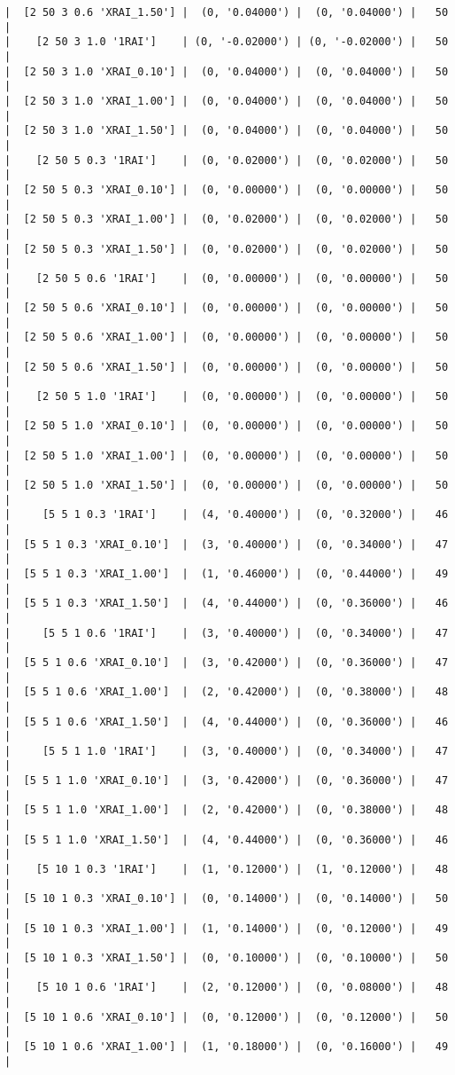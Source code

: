 \documentclass{article}
\begin{document}
\begin{verbatim}
|  [2 50 3 0.6 'XRAI_1.50'] |  (0, '0.04000') |  (0, '0.04000') |   50  |
|    [2 50 3 1.0 '1RAI']    | (0, '-0.02000') | (0, '-0.02000') |   50  |
|  [2 50 3 1.0 'XRAI_0.10'] |  (0, '0.04000') |  (0, '0.04000') |   50  |
|  [2 50 3 1.0 'XRAI_1.00'] |  (0, '0.04000') |  (0, '0.04000') |   50  |
|  [2 50 3 1.0 'XRAI_1.50'] |  (0, '0.04000') |  (0, '0.04000') |   50  |
|    [2 50 5 0.3 '1RAI']    |  (0, '0.02000') |  (0, '0.02000') |   50  |
|  [2 50 5 0.3 'XRAI_0.10'] |  (0, '0.00000') |  (0, '0.00000') |   50  |
|  [2 50 5 0.3 'XRAI_1.00'] |  (0, '0.02000') |  (0, '0.02000') |   50  |
|  [2 50 5 0.3 'XRAI_1.50'] |  (0, '0.02000') |  (0, '0.02000') |   50  |
|    [2 50 5 0.6 '1RAI']    |  (0, '0.00000') |  (0, '0.00000') |   50  |
|  [2 50 5 0.6 'XRAI_0.10'] |  (0, '0.00000') |  (0, '0.00000') |   50  |
|  [2 50 5 0.6 'XRAI_1.00'] |  (0, '0.00000') |  (0, '0.00000') |   50  |
|  [2 50 5 0.6 'XRAI_1.50'] |  (0, '0.00000') |  (0, '0.00000') |   50  |
|    [2 50 5 1.0 '1RAI']    |  (0, '0.00000') |  (0, '0.00000') |   50  |
|  [2 50 5 1.0 'XRAI_0.10'] |  (0, '0.00000') |  (0, '0.00000') |   50  |
|  [2 50 5 1.0 'XRAI_1.00'] |  (0, '0.00000') |  (0, '0.00000') |   50  |
|  [2 50 5 1.0 'XRAI_1.50'] |  (0, '0.00000') |  (0, '0.00000') |   50  |
|     [5 5 1 0.3 '1RAI']    |  (4, '0.40000') |  (0, '0.32000') |   46  |
|  [5 5 1 0.3 'XRAI_0.10']  |  (3, '0.40000') |  (0, '0.34000') |   47  |
|  [5 5 1 0.3 'XRAI_1.00']  |  (1, '0.46000') |  (0, '0.44000') |   49  |
|  [5 5 1 0.3 'XRAI_1.50']  |  (4, '0.44000') |  (0, '0.36000') |   46  |
|     [5 5 1 0.6 '1RAI']    |  (3, '0.40000') |  (0, '0.34000') |   47  |
|  [5 5 1 0.6 'XRAI_0.10']  |  (3, '0.42000') |  (0, '0.36000') |   47  |
|  [5 5 1 0.6 'XRAI_1.00']  |  (2, '0.42000') |  (0, '0.38000') |   48  |
|  [5 5 1 0.6 'XRAI_1.50']  |  (4, '0.44000') |  (0, '0.36000') |   46  |
|     [5 5 1 1.0 '1RAI']    |  (3, '0.40000') |  (0, '0.34000') |   47  |
|  [5 5 1 1.0 'XRAI_0.10']  |  (3, '0.42000') |  (0, '0.36000') |   47  |
|  [5 5 1 1.0 'XRAI_1.00']  |  (2, '0.42000') |  (0, '0.38000') |   48  |
|  [5 5 1 1.0 'XRAI_1.50']  |  (4, '0.44000') |  (0, '0.36000') |   46  |
|    [5 10 1 0.3 '1RAI']    |  (1, '0.12000') |  (1, '0.12000') |   48  |
|  [5 10 1 0.3 'XRAI_0.10'] |  (0, '0.14000') |  (0, '0.14000') |   50  |
|  [5 10 1 0.3 'XRAI_1.00'] |  (1, '0.14000') |  (0, '0.12000') |   49  |
|  [5 10 1 0.3 'XRAI_1.50'] |  (0, '0.10000') |  (0, '0.10000') |   50  |
|    [5 10 1 0.6 '1RAI']    |  (2, '0.12000') |  (0, '0.08000') |   48  |
|  [5 10 1 0.6 'XRAI_0.10'] |  (0, '0.12000') |  (0, '0.12000') |   50  |
|  [5 10 1 0.6 'XRAI_1.00'] |  (1, '0.18000') |  (0, '0.16000') |   49  |

\end{verbatim}
\end{document}
